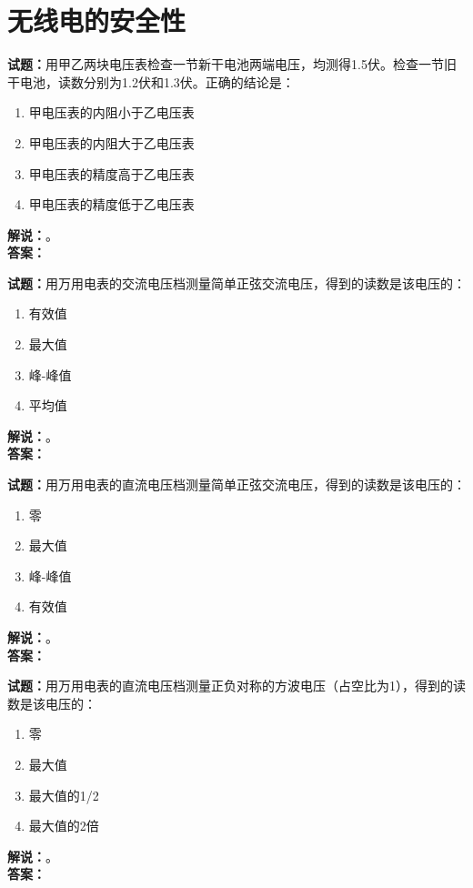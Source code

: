 \documentclass{ctexbook}
\begin{document}
\bigskip


\chapter{无线电的安全性}

\newpage


\noindent\textbf{试题：}用甲乙两块电压表检查一节新干电池两端电压，均测得1.5伏。检查一节旧干电池，读数分别为1.2伏和1.3伏。正确的结论是：
\begin{enumerate}[leftmargin=3em]
\item 甲电压表的内阻小于乙电压表
\item 甲电压表的内阻大于乙电压表
\item 甲电压表的精度高于乙电压表
\item 甲电压表的精度低于乙电压表
\end{enumerate}
\noindent\textbf{解说：}\textbf{}。\\\noindent\textbf{答案：}

\bigskip




\noindent\textbf{试题：}用万用电表的交流电压档测量简单正弦交流电压，得到的读数是该电压的：
\begin{enumerate}[leftmargin=3em]
\item 有效值
\item 最大值
\item 峰-峰值
\item 平均值
\end{enumerate}
\noindent\textbf{解说：}\textbf{}。\\\noindent\textbf{答案：}

\bigskip




\noindent\textbf{试题：}用万用电表的直流电压档测量简单正弦交流电压，得到的读数是该电压的：
\begin{enumerate}[leftmargin=3em]
\item 零
\item 最大值
\item 峰-峰值
\item 有效值
\end{enumerate}
\noindent\textbf{解说：}\textbf{}。\\\noindent\textbf{答案：}

\bigskip




\noindent\textbf{试题：}用万用电表的直流电压档测量正负对称的方波电压（占空比为1），得到的读数是该电压的：
\begin{enumerate}[leftmargin=3em]
\item 零
\item 最大值
\item 最大值的1/2
\item 最大值的2倍
\end{enumerate}
\noindent\textbf{解说：}\textbf{}。\\\noindent\textbf{答案：}
\end{document}
